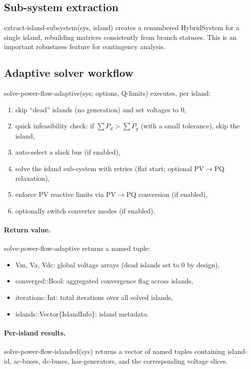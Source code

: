 \documentclass[11pt]{article}
\def\code#1{#1}%
\def\_{-}%
\newcommand{\code}[1]{\nolinkurl{#1}}
\begin{document}
\subsection{Sub-system extraction}
\code{extract\_island\_subsystem(sys, island)} creates a renumbered \code{HybridSystem} for a single island, rebuilding matrices consistently from branch statuses. This is an important robustness feature for contingency analysis.

\subsection{Adaptive solver workflow}
\code{solve\_power\_flow\_adaptive(sys; options, Q\_limits)} executes, per island:
\begin{enumerate}[leftmargin=*]
  \item skip ``dead'' islands (no generation) and set voltages to 0,
  \item quick infeasibility check: if $\sum P_d > \sum P_g$ (with a small tolerance), skip the island,
  \item auto-select a slack bus (if enabled),
  \item solve the island sub-system with retries (flat start; optional PV$\rightarrow$PQ relaxation),
  \item enforce PV reactive limits via PV$\rightarrow$PQ conversion (if enabled),
  \item optionally switch converter modes (if enabled).
\end{enumerate}

\paragraph{Return value.}
\code{solve\_power\_flow\_adaptive} returns a named tuple:
\begin{itemize}[leftmargin=*]
  \item \code{Vm, Va, Vdc}: global voltage arrays (dead islands set to 0 by design),
  \item \code{converged::Bool}: aggregated convergence flag across islands,
  \item \code{iterations::Int}: total iterations over all solved islands,
  \item \code{islands::Vector\{IslandInfo\}}: island metadata.
\end{itemize}

\paragraph{Per-island results.}
\code{solve\_power\_flow\_islanded(sys)} returns a vector of named tuples containing \code{island\_id}, \code{ac\_buses}, \code{dc\_buses}, \code{has\_generators}, and the corresponding voltage slices.
\end{document}
